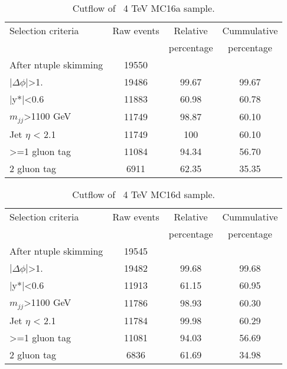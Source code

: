 \begin{table}[ht]
\begin{center}
\begin{tabular}{|l|c|c|c|}
\hline
Selection criteria & Raw events &  Relative & Cummulative \\
 & & percentage & percentage \\
\hline
After ntuple skimming & 19550 &  &  \\
$|\Delta\phi|$>1. & 19486 & 99.67 & 99.67 \\
|y*|<0.6 & 11883 & 60.98 & 60.78 \\
$m_{jj}$>1100 GeV & 11749 & 98.87 & 60.10 \\
Jet $\eta$ < 2.1 & 11749 & 100 & 60.10 \\
>=1 gluon tag & 11084 & 94.34 & 56.70 \\
2 gluon tag & 6911 & 62.35 & 35.35 \\
\hline
\end{tabular}
\end{center}
\caption{Cutflow of \Hprime\ 4 TeV MC16a sample.}
\end{table}

\begin{table}[ht]
\begin{center}
\begin{tabular}{|l|c|c|c|}
\hline
Selection criteria & Raw events &  Relative & Cummulative \\
 & & percentage & percentage \\
\hline
After ntuple skimming & 19545 &  &  \\
$|\Delta\phi|$>1. & 19482 & 99.68 & 99.68 \\
|y*|<0.6 & 11913 & 61.15 & 60.95 \\
$m_{jj}$>1100 GeV & 11786 & 98.93 & 60.30 \\
Jet $\eta$ < 2.1 & 11784 & 99.98 & 60.29 \\
>=1 gluon tag & 11081 & 94.03 & 56.69 \\
2 gluon tag & 6836 & 61.69 & 34.98 \\
\hline
\end{tabular}
\end{center}
\caption{Cutflow of \Hprime\ 4 TeV MC16d sample.}
\end{table}

